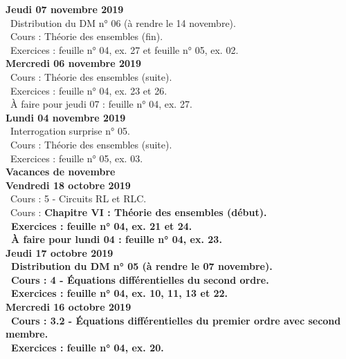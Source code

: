 \documentclass[12pt,a4paper]{article}
\begin{document}
\noindent\textbf{Jeudi 07 novembre 2019}\\
\bu\ Distribution du DM n° 06 (à rendre le 14 novembre).\\
\bu\ Cours : Théorie des ensembles (fin).\\
\bu\ Exercices : feuille n° 04, ex. 27 et feuille n° 05, ex. 02.\vspace{.4cm}\\

\noindent\textbf{\bf Mercredi 06 novembre 2019}\\
\bu\ Cours : Théorie des ensembles (suite).\\
\bu\ Exercices : feuille n° 04, ex. 23 et 26.\\
\bu\ À faire pour jeudi 07 : feuille n° 04, ex. 27.\vspace{.4cm}\\
 
\noindent\textbf{Lundi 04 novembre 2019}\\
\bu\ Interrogation surprise n° 05.\\
\bu\ Cours : Théorie des ensembles (suite).\\
\bu\ Exercices : feuille n° 05, ex. 03.\vspace{.4cm}\\
 
\noindent\textbf{ Vacances de novembre }\vspace{.4cm}\\
 
\noindent\textbf{Vendredi 18 octobre 2019}\\
\bu\ Cours : 5 - Circuits RL et RLC.\\
\bu\ Cours : \bf Chapitre VI \rm : Théorie des ensembles (début).\\
\bu\ Exercices : feuille n° 04, ex. 21 et 24.\\
\bu\ À faire pour lundi 04 : feuille n° 04, ex. 23.\vspace{.4cm}\\

\noindent\textbf{Jeudi 17 octobre 2019}\\
\bu\ Distribution du DM n° 05 (à rendre le 07 novembre).\\
\bu\ Cours : 4 - Équations différentielles du second ordre.\\
\bu\ Exercices : feuille n° 04, ex. 10, 11, 13 et 22.\vspace{.4cm}\\

\noindent\textbf{\bf Mercredi 16 octobre 2019}\\
\bu\ Cours : 3.2 - Équations différentielles du premier ordre avec second membre.\\
\bu\ Exercices : feuille n° 04, ex. 20.\vspace{.4cm}\\
  
\end{document}
